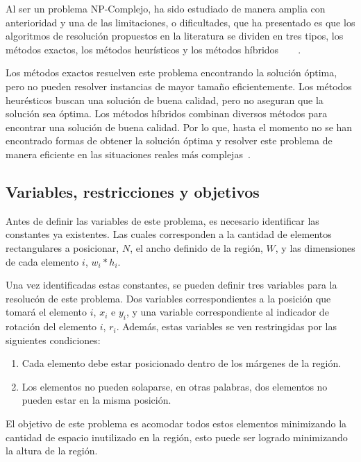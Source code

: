 \documentclass[letter, 10pt]{article}
\begin{document}
Al ser un problema NP-Complejo, ha sido estudiado de manera amplia con anterioridad y una de las limitaciones, o dificultades, que ha presentado es que los algoritmos de resoluci\'on propuestos en la literatura se dividen en tres tipos, los m\'etodos exactos, los m\'etodos heur\'isticos y los m\'etodos h\'ibridos~\cite{he2013heuristics}~\cite{junior2023framework}~\cite{oliveira2016survey}~\cite{wei2017improved}.

Los m\'etodos exactos resuelven este problema encontrando la soluci\'on \'optima, pero no pueden resolver instancias de mayor tama\~no eficientemente. Los m\'etodos heur\'esticos buscan una soluci\'on de buena calidad, pero no aseguran que la soluci\'on sea \'optima. Los m\'etodos h\'ibridos combinan diversos m\'etodos para encontrar una soluci\'on de buena calidad. Por lo que, hasta el momento no se han encontrado formas de obtener la soluci\'on \'optima y resolver este problema de manera eficiente en las situaciones reales m\'as complejas~\cite{thomas2013hybrid}.

\subsection{Variables, restricciones y objetivos}

Antes de definir las variables de este problema, es necesario identificar las constantes ya existentes. Las cuales corresponden a la cantidad de elementos rectangulares a posicionar, $N$, el ancho definido de la regi\'on, $W$, y las dimensiones de cada elemento $i$, $w_{i}*h_{i}$.

Una vez identificadas estas constantes, se pueden definir tres variables para la resoluc\'on de este problema. Dos variables correspondientes a la posici\'on que tomar\'a el elemento $i$, $x_{i}$ e $y_{i}$, y una variable correspondiente al indicador de rotaci\'on del elemento $i$, $r_{i}$. Adem\'as, estas variables se ven restringidas por las siguientes condiciones:

\begin{enumerate}
    \item Cada elemento debe estar posicionado dentro de los m\'argenes de la regi\'on.
    \item Los elementos no pueden solaparse, en otras palabras, dos elementos no pueden estar en la misma posici\'on.
\end{enumerate}

El objetivo de este problema es acomodar todos estos elementos minimizando la cantidad de espacio inutilizado en la regi\'on, esto puede ser logrado minimizando la altura de la regi\'on.
\end{document}

